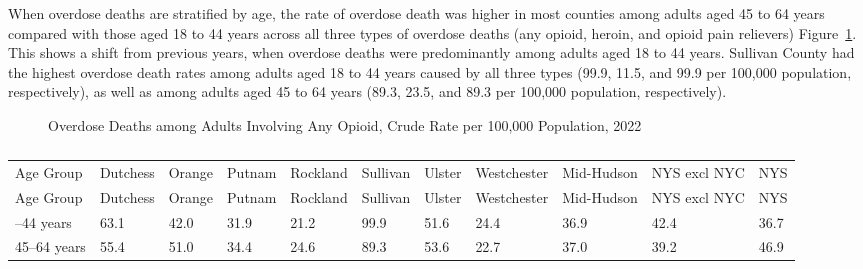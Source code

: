 \documentclass[
  english,
  letterpaper,
]{report}
\begin{document}
When overdose deaths are stratified by age, the rate of overdose death
was higher in most counties among adults aged 45 to 64 years compared
with those aged 18 to 44 years across all three types of overdose deaths
(any opioid, heroin, and opioid pain relievers)
Figure~\ref{fig-18to64-anyop-od-crude}. This shows a shift from previous
years, when overdose deaths were predominantly among adults aged 18 to
44 years. Sullivan County had the highest overdose death rates among
adults aged 18 to 44 years caused by all three types (99.9, 11.5, and
99.9 per 100,000 population, respectively), as well as among adults aged
45 to 64 years (89.3, 23.5, and 89.3 per 100,000 population,
respectively).

\begin{figure}


\caption{\label{fig-18to64-anyop-od-crude}Overdose Deaths among Adults
Involving Any Opioid, Crude Rate per 100,000 Population, 2022}

\end{figure}%

\begin{longtable}[]{@{}lllllllllll@{}}

\caption{\label{tbl-18to64-anyop-od-crude}Overdose Deaths among Adults
Involving Any Opioid, Crude Rate per 100,000 Population, 2022}

\tabularnewline

\caption{}\label{T_969ad}\tabularnewline
\toprule\noalign{}
Age Group & Dutchess & Orange & Putnam & Rockland & Sullivan & Ulster &
Westchester & Mid-Hudson & NYS excl NYC & NYS \\
\midrule\noalign{}
\endfirsthead
\toprule\noalign{}
Age Group & Dutchess & Orange & Putnam & Rockland & Sullivan & Ulster &
Westchester & Mid-Hudson & NYS excl NYC & NYS \\
\midrule\noalign{}
\endhead
\bottomrule\noalign{}
\endlastfoot
18--44 years & 63.1 & 42.0 & 31.9 & 21.2 & 99.9 & 51.6 & 24.4 & 36.9 &
42.4 & 36.7 \\
45--64 years & 55.4 & 51.0 & 34.4 & 24.6 & 89.3 & 53.6 & 22.7 & 37.0 &
39.2 & 46.9 \\

\end{longtable}
\end{document}
